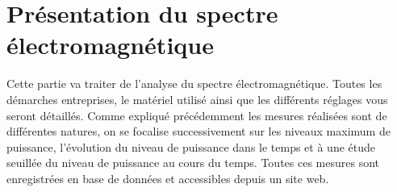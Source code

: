 \part{Présentation du spectre électromagnétique}

Cette partie va traiter de l'analyse du spectre électromagnétique.
Toutes les démarches entreprises, le matériel utilisé ainsi que
    les différents réglages vous seront détaillés.
Comme expliqué précédemment les mesures réalisées sont de différentes natures,
    on se focalise successivement sur les niveaux maximum de puissance,
    l’évolution du niveau de puissance dans le temps et à une étude seuillée du niveau de puissance au cours du temps.
Toutes ces mesures sont enregistrées en base de données et accessibles depuis un site web.